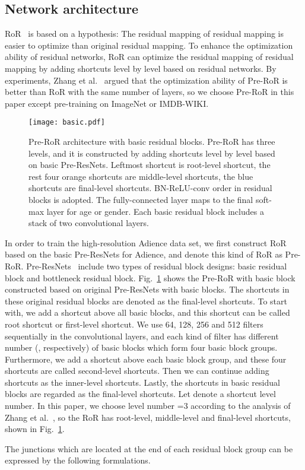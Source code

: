 \documentclass[journal]{IEEEtran}
\begin{document}
\subsection{Network architecture}
RoR~\cite{Ror} is based on a hypothesis: The residual mapping of residual mapping is easier to optimize than original residual mapping. To enhance the optimization ability of residual networks, RoR can optimize the residual mapping of residual mapping by adding shortcuts level by level based on residual networks. By experiments, Zhang et al.~\cite{Ror} argued that the optimization ability of Pre-RoR is better than RoR with the same number of layers, so we choose Pre-RoR in this paper except pre-training on ImageNet or IMDB-WIKI.
\par 
\begin{figure}
\centering
\texttt{[image: basic.pdf]}
\caption{Pre-RoR architecture with basic residual blocks. Pre-RoR has three levels, and it is constructed by adding shortcuts level by level based on basic Pre-ResNets. Leftmost shortcut is root-level shortcut, the rest four orange shortcuts are middle-level shortcuts, the blue shortcuts are final-level shortcuts. BN-ReLU-conv order in residual blocks is adopted. The fully-connected layer maps to the final soft-max layer for age or gender. Each basic residual block includes a stack of two convolutional layers.}
\label{fig:basic}
\end{figure}
In order to train the high-resolution Adience data set, we first construct RoR based on the basic Pre-ResNets for Adience, and denote this kind of RoR as Pre-RoR. Pre-ResNets~\cite{he2016preresnets} include two types of residual block designs: basic residual block and bottleneck residual block. 
Fig.~\ref{fig:basic} shows the Pre-RoR with basic block constructed based on original Pre-ResNets with  basic blocks. The shortcuts in these  original residual blocks are denoted as the final-level shortcuts.
 To start with, we add a shortcut above all basic blocks, and this shortcut can be called root shortcut or first-level shortcut. We use 64, 128, 256 and 512 filters sequentially in the convolutional layers, and each kind of filter has different number (, respectively) of basic blocks which form four basic block groups. 
Furthermore, we add a shortcut above each basic block group, and these four shortcuts are called second-level shortcuts. Then we can continue adding shortcuts as the inner-level shortcuts. 
Lastly, the shortcuts in basic residual blocks are regarded as the final-level shortcuts. Let  denote a shortcut level number. In this paper, we choose level number =3 according to the analysis of Zhang et al.~\cite{Ror}, so the RoR has root-level, middle-level and final-level shortcuts, shown in Fig.~\ref{fig:basic}.
\par 
The junctions which are located at the end of each residual block group can be expressed by the following formulations.
\end{document}
